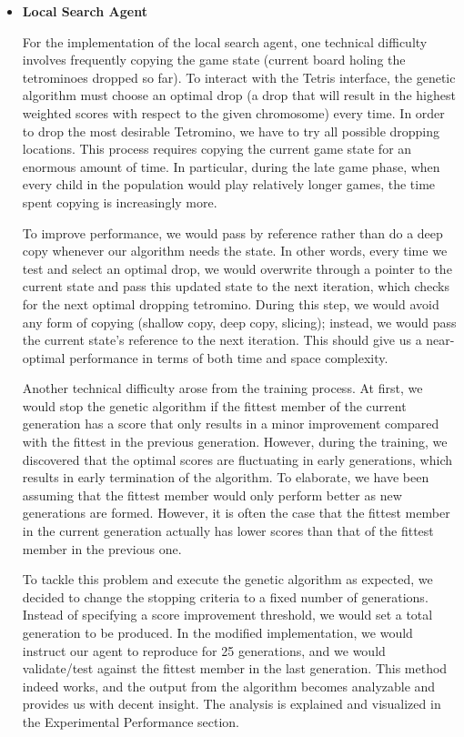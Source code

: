\documentclass[letterpaper]{article} %
\begin{document}
\begin{itemize}
  
  \item \textbf{Local Search Agent}
  

  For the implementation of the local search agent, one technical difficulty involves frequently copying the game state (current board holing the tetrominoes dropped so far). To interact with the Tetris interface, the genetic algorithm must choose an optimal drop (a drop that will result in the highest weighted scores with respect to the given chromosome) every time. In order to drop the most desirable Tetromino, we have to try all possible dropping locations. This process requires copying the current game state for an enormous amount of time. In particular, during the late game phase, when every child in the population would play relatively longer games, the time spent copying is increasingly more.
  
  To improve performance, we would pass by reference rather than do a deep copy whenever our algorithm needs the state. In other words, every time we test and select an optimal drop, we would overwrite through a pointer to the current state and pass this updated state to the next iteration, which checks for the next optimal dropping tetromino. During this step, we would avoid any form of copying (shallow copy, deep copy, slicing); instead, we would pass the current state's reference to the next iteration. This should give us a near-optimal performance in terms of both time and space complexity.
   
  Another technical difficulty arose from the training process. At first, we would stop the genetic algorithm if the fittest member of the current generation has a score that only results in a minor improvement compared with the fittest in the previous generation. However, during the training, we discovered that the optimal scores are fluctuating in early generations, which results in early termination of the algorithm. To elaborate, we have been assuming that the fittest member would only perform better as new generations are formed. However, it is often the case that the fittest member in the current generation actually has lower scores than that of the fittest member in the previous one. 
   
  To tackle this problem and execute the genetic algorithm as expected, we decided to change the stopping criteria to a fixed number of generations. Instead of specifying a score improvement threshold, we would set a total generation to be produced. In the modified implementation, we would instruct our agent to reproduce for 25 generations, and we would validate/test against the fittest member in the last generation. This method indeed works, and the output from the algorithm becomes analyzable and provides us with decent insight. The analysis is explained and visualized in the Experimental Performance section.
  

\end{itemize}
\end{document}
